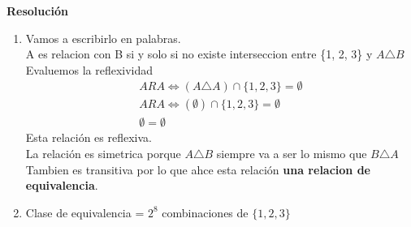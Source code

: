 \documentclass[11pt]{article}
\begin{document}
\textbf{Resolución}

\begin{enumerate}[label=\roman*)]
    \item Vamos a escribirlo en palabras. \\
    A es relacion con B si y solo si no existe interseccion entre \{1, 2, 3\} y $A \triangle B$ \\
    Evaluemos la reflexividad
    \begin{align*}
        A R A \Leftrightarrow (A \triangle A) \cap \{1,2,3\} = \emptyset \\
        A R A \Leftrightarrow (\emptyset) \cap \{1,2,3\} = \emptyset \\
        \emptyset = \emptyset 
    \end{align*}
    Esta relación es reflexiva. \\
    La relación es simetrica porque $A \triangle B$ siempre va a ser lo mismo que $ B \triangle A$ \\
    Tambien es transitiva por lo que ahce esta relación \textbf{una relacion de equivalencia}.
    \item Clase de equivalencia = $2^{8}$ combinaciones de $\{1,2,3\}$
\end{enumerate}
\end{document}
